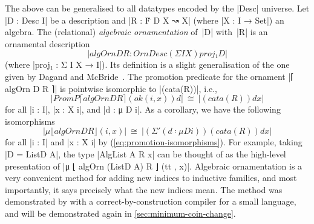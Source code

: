 The above can be generalised to all datatypes encoded by the |Desc| universe.
Let |D : Desc I| be a description and |R : Ḟ D X ↝ X| (where |X : I → Set|) an algebra.
The (relational) \emph{algebraic ornamentation} of~|D| with~|R| is an ornamental description
\[ |algOrn D R : OrnDesc (Σ I X) proj₁ D| \]
(where |proj₁ : Σ I X → I|).
Its definition is a slight generalisation of the one given by Dagand and McBride~\cite[supplementary code]{Dagand-functional-ornaments}.
The promotion predicate for the ornament |⌈ algOrn D R ⌉| is pointwise isomorphic to |(cata(R))|, i.e.,
\begin{equation}
|PromP ⌈ algOrn D R ⌉ (ok (i , x)) d| ~\cong~ |(cata(R)) d x|
\label{eq:PromP-algOrn}
\end{equation}
for all |i : I|, |x : X i|, and |d : μ D i|.
As a corollary, we have the following isomorphisms
\begin{equation}
|μ ⌊ algOrn D R ⌋ (i , x)| ~\cong~ |(Σ'(d ∶ μ D i)) (cata(R)) d x|
\label{eq:algOrn}
\end{equation}
for all |i : I| and |x : X i| by (\ref{eq:promotion-isomorphisms}).
For example, taking |D = ListD A|, the type |AlgList A R x| can be thought of as the high-level presentation of |μ ⌊ algOrn (ListD A) R ⌋ (tt , x)|.
Algebraic ornamentation is a very convenient method for adding new indices to inductive families, and most importantly, it says precisely what the new indices mean.
The method was demonstrated by \citet{McBride-ornaments} with a correct-by-construction compiler for a small language, and will be demonstrated again in \autoref{sec:minimum-coin-change}.

